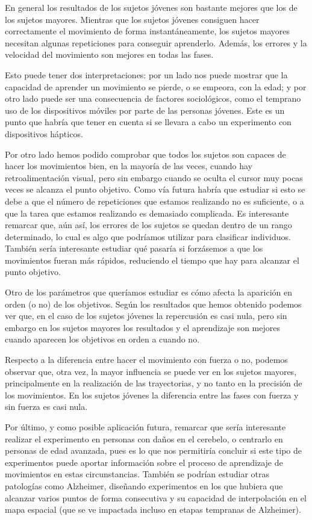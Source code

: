\documentclass[a4paper,11pt, oneside]{book}
\begin{document}
En general los resultados de los sujetos jóvenes son bastante mejores que los de los sujetos mayores. Mientras que los sujetos jóvenes consiguen hacer correctamente el movimiento de forma instantáneamente, los sujetos mayores necesitan algunas repeticiones para conseguir aprenderlo. Además, los errores y la velocidad del movimiento son mejores en todas las fases.

Esto puede tener dos interpretaciones: por un lado nos puede mostrar que la capacidad de aprender un movimiento se pierde, o se empeora, con la edad; y por otro lado puede ser una consecuencia de factores sociológicos, como el temprano uso de los dispositivos móviles por parte de las personas jóvenes. Este es un punto que habría que tener en cuenta si se llevara a cabo un experimento con dispositivos hápticos.

Por otro lado hemos podido comprobar que todos los sujetos son capaces de hacer los movimientos bien, en la mayoría de las veces, cuando hay retroalimentación visual, pero sin embargo cuando se oculta el cursor muy pocas veces se alcanza el punto objetivo. Como vía futura habría que estudiar si esto se debe a que el número de repeticiones que estamos realizando no es suficiente, o a que la tarea que estamos realizando es demasiado complicada. Es interesante remarcar que, aún así, los errores de los sujetos se quedan dentro de un rango determinado, lo cual es algo que podríamos utilizar para clasificar individuos. También sería interesante estudiar qué pasaría si forzásemos a que los movimientos fueran más rápidos, reduciendo el tiempo que hay para alcanzar el punto objetivo.

Otro de los parámetros que queríamos estudiar es cómo afecta la aparición en orden (o no) de los objetivos. Según los resultados que hemos obtenido podemos ver que, en el caso de los sujetos jóvenes la repercusión es casi nula, pero sin embargo en los sujetos mayores los resultados y el aprendizaje son mejores cuando aparecen los objetivos en orden a cuando no.


Respecto a la diferencia entre hacer el movimiento con fuerza o no, podemos observar que, otra vez, la mayor influencia se puede ver en los sujetos mayores, principalmente en la realización de las trayectorias, y no tanto en la precisión de los movimientos. En los sujetos jóvenes la diferencia entre las fases con fuerza y sin fuerza es casi nula.

Por último, y como posible aplicación futura, remarcar que sería interesante realizar el experimento en personas con daños en el cerebelo, o centrarlo en personas de edad avanzada, pues es lo que nos permitiría concluir si este tipo de experimentos puede aportar información sobre el proceso de aprendizaje de movimientos en estas circunstancias.
También se podrían estudiar otras patologías como Alzheimer, diseñando experimentos en los que hubiera que alcanzar varios puntos de forma consecutiva y su capacidad de interpolación en el mapa espacial (que se ve impactada incluso en etapas tempranas de Alzheimer).
\end{document}
